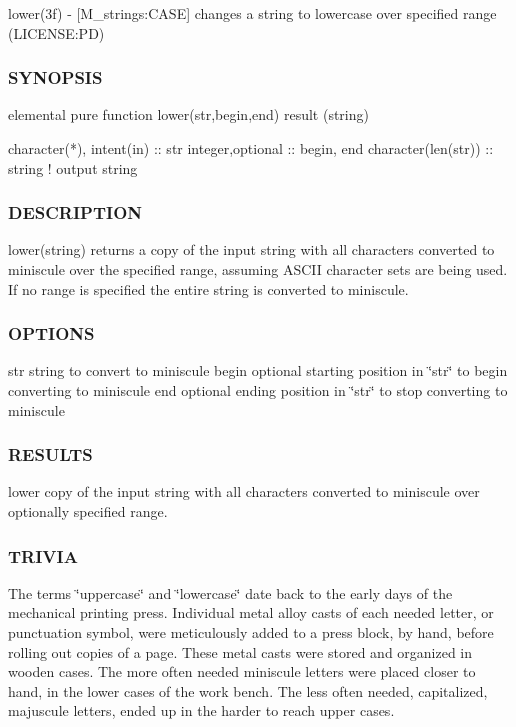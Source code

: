 lower(3f) -\/ \mbox{[}M\+\_\+strings\+:C\+A\+SE\mbox{]} changes a string to lowercase over specified range (L\+I\+C\+E\+N\+SE\+:PD) 

\subsubsection*{S\+Y\+N\+O\+P\+S\+IS}

\begin{DoxyVerb}elemental pure function lower(str,begin,end) result (string)

 character(*), intent(in) :: str
 integer,optional         :: begin, end
 character(len(str))      :: string  ! output string
\end{DoxyVerb}
 \subsubsection*{D\+E\+S\+C\+R\+I\+P\+T\+I\+ON}

lower(string) returns a copy of the input string with all characters converted to miniscule over the specified range, assuming A\+S\+C\+II character sets are being used. If no range is specified the entire string is converted to miniscule.

\subsubsection*{O\+P\+T\+I\+O\+NS}

str string to convert to miniscule begin optional starting position in \char`\"{}str\char`\"{} to begin converting to miniscule end optional ending position in \char`\"{}str\char`\"{} to stop converting to miniscule

\subsubsection*{R\+E\+S\+U\+L\+TS}

lower copy of the input string with all characters converted to miniscule over optionally specified range.

\subsubsection*{T\+R\+I\+V\+IA}

The terms \char`\"{}uppercase\char`\"{} and \char`\"{}lowercase\char`\"{} date back to the early days of the mechanical printing press. Individual metal alloy casts of each needed letter, or punctuation symbol, were meticulously added to a press block, by hand, before rolling out copies of a page. These metal casts were stored and organized in wooden cases. The more often needed miniscule letters were placed closer to hand, in the lower cases of the work bench. The less often needed, capitalized, majuscule letters, ended up in the harder to reach upper cases.

